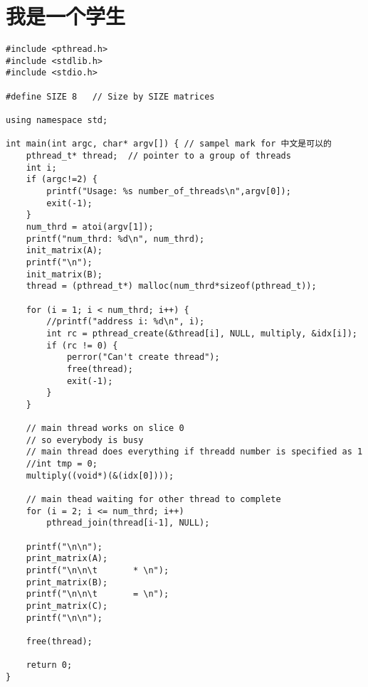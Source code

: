 \documentclass[9pt,b5paper]{article}
\begin{document}
\section{我是一个学生}
\label{sec-5}
\begin{verbatim}
#include <pthread.h>
#include <stdlib.h>
#include <stdio.h>

#define SIZE 8   // Size by SIZE matrices

using namespace std;

int main(int argc, char* argv[]) { // sampel mark for 中文是可以的
    pthread_t* thread;  // pointer to a group of threads
    int i;
    if (argc!=2) {    
        printf("Usage: %s number_of_threads\n",argv[0]);
        exit(-1);
    }
    num_thrd = atoi(argv[1]);
    printf("num_thrd: %d\n", num_thrd);
    init_matrix(A);
    printf("\n");
    init_matrix(B);
    thread = (pthread_t*) malloc(num_thrd*sizeof(pthread_t));

    for (i = 1; i < num_thrd; i++) {    
        //printf("address i: %d\n", i);
        int rc = pthread_create(&thread[i], NULL, multiply, &idx[i]);
        if (rc != 0) {
            perror("Can't create thread");
            free(thread);
            exit(-1);
        }
    }

    // main thread works on slice 0
    // so everybody is busy
    // main thread does everything if threadd number is specified as 1
    //int tmp = 0;
    multiply((void*)(&(idx[0])));

    // main thead waiting for other thread to complete
    for (i = 2; i <= num_thrd; i++)
        pthread_join(thread[i-1], NULL);

    printf("\n\n");
    print_matrix(A);
    printf("\n\n\t       * \n");
    print_matrix(B);
    printf("\n\n\t       = \n");
    print_matrix(C);
    printf("\n\n");

    free(thread);

    return 0;
}
\end{verbatim}
\end{document}
